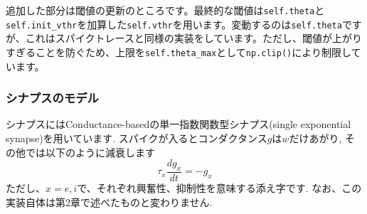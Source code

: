 追加した部分は閾値の更新のところです。最終的な閾値は\texttt{self.theta}と\texttt{self.init\_vthr}を加算した\texttt{self.vthr}を用います。変動するのは\texttt{self.theta}ですが、これはスパイクトレースと同様の実装をしています。ただし、閾値が上がりすぎることを防ぐため、上限を\texttt{self.theta\_max}として\texttt{np.clip()}により制限しています。

\subsubsection{シナプスのモデル}
シナプスにはConductance-basedの単一指数関数型シナプス(single exponential synapse)を用いています. スパイクが入るとコンダクタンス$g$は$w$だけあがり, その他では以下のように減衰します
\begin{equation}
\tau_{x} \frac{dg_x}{d t}=-g_x    
\end{equation}
ただし、$x=e, i$で、それぞれ興奮性、抑制性を意味する添え字です. なお、この実装自体は第2章で述べたものと変わりません. 

